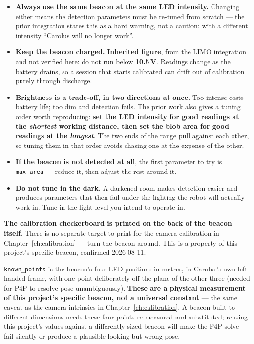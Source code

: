 \documentclass[11pt]{report}
\newenvironment{warningbox}%
  {\begin{lrbox}{\warnbox}\begin{minipage}{0.90\textwidth}}%
  {\end{minipage}\end{lrbox}%
   \begin{center}\fcolorbox{black}{codebg}{\usebox{\warnbox}}\end{center}}
\begin{document}
\begin{itemize}
  \item \textbf{Always use the same beacon at the same LED intensity.}
  Changing either means the detection parameters must be re-tuned from
  scratch --- the prior integration states this as a hard warning, not a
  caution: with a different intensity ``Carolus will no longer work''.

  \item \textbf{Keep the beacon charged.} \textbf{Inherited figure}, from the
  LIMO integration and not verified here: do not run below \textbf{10.5\,V}.
  Readings change as the battery drains, so a session that starts calibrated
  can drift out of calibration purely through discharge.

  \item \textbf{Brightness is a trade-off, in two directions at once.} Too
  intense costs battery life; too dim and detection fails. The prior work
  also gives a tuning order worth reproducing: \textbf{set the LED intensity
  for good readings at the \emph{shortest} working distance, then set the
  blob area for good readings at the \emph{longest}}. The two ends of the
  range pull against each other, so tuning them in that order avoids chasing
  one at the expense of the other.

  \item \textbf{If the beacon is not detected at all}, the first parameter to
  try is \texttt{max\_area} --- reduce it, then adjust the rest around it.

  \item \textbf{Do not tune in the dark.} A darkened room makes detection
  easier and produces parameters that then fail under the lighting the robot
  will actually work in. Tune in the light level you intend to operate in.
\end{itemize}

\begin{warningbox}
\textbf{The calibration checkerboard is printed on the back of the beacon
itself.} There is no separate target to print for the camera calibration in
Chapter~\ref{ch:calibration} --- turn the beacon around. This is a property
of this project's specific beacon, confirmed 2026-08-11.
\end{warningbox}

\texttt{known\_points} is the beacon's four LED positions in metres, in
Carolus's own left-handed frame, with one point deliberately off the plane
of the other three (needed for P4P to resolve pose unambiguously).
\textbf{These are a physical measurement of this project's specific beacon,
not a universal constant} --- the same caveat as the camera intrinsics in
Chapter~\ref{ch:calibration}. A beacon built to different dimensions needs
these four points re-measured and substituted; reusing this project's values
against a differently-sized beacon will make the P4P solve fail silently or
produce a plausible-looking but wrong pose.
\end{document}
